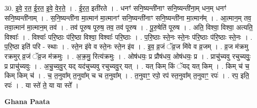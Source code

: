 \documentclass[17pt]{extarticle}
\begin{document}
30. इ॒वे॒ र॒त॒ ई॒र॒त॒ इ॒वे॒ वे॒र॒ते॒ । . ई॒र॒त॒ इती॑रते । . धनꣳ॑ सनि॒ष्यन्ती॑नाꣳ सनि॒ष्यन्ती॑ना॒म् धन॒म् धनꣳ॑ सनि॒ष्यन्ती॑नाम् । . स॒नि॒ष्यन्ती॑ना मा॒त्मान॑ मा॒त्मानꣳ॑ सनि॒ष्यन्ती॑नाꣳ सनि॒ष्यन्ती॑ना मा॒त्मान᳚म् । . आ॒त्मान॒म् तव॒ तवा॒त्मान॑ मा॒त्मान॒म् तव॑ । . तव॑ पूरुष पूरुष॒ तव॒ तव॑ पूरुष । . पू॒रु॒षेति॑ पूरुष । . अति॒ विश्वा॒ विश्वा॒ अत्यति॒ विश्वाः᳚ । . विश्वाः᳚ परि॒ष्ठाः प॑रि॒ष्ठा विश्वा॒ विश्वाः᳚ परि॒ष्ठाः । . प॒रि॒ष्ठाः स्ते॒नः स्ते॒नः प॑रि॒ष्ठाः प॑रि॒ष्ठाः स्ते॒नः । . प॒रि॒ष्ठा इति॑ परि - स्थाः । . स्ते॒न इ॑वे व स्ते॒नः स्ते॒न इ॑व । . इ॒व॒ व्र॒जं ॅव्र॒ज मि॑वे व व्र॒जम् । . व्र॒ज म॑क्रमु रक्रमुर् व्र॒जं ॅव्र॒ज म॑क्रमुः । . अ॒क्र॒मु॒ रित्य॑क्रमुः । . ओष॑धयः॒ प्र प्रौष॑धय॒ ओष॑धयः॒ प्र । . प्राचु॑च्यवु रचुच्यवुः॒ प्र प्राचु॑च्यवुः । . अ॒चु॒च्य॒वु॒र् यद् यद॑चुच्यवु रचुच्यवु॒र् यत् । . यत् किम् किं ॅयद् यत् किम् । . किम् च॑ च॒ किम् किम् च॑ । . च॒ त॒नुवा᳚म् त॒नुवा᳚म् च च त॒नुवा᳚म् । . त॒नुवाꣳ॒॒ रपो॒ रप॑ स्त॒नुवा᳚म् त॒नुवाꣳ॒॒ रपः॑ । . रप॒ इति॒ रपः॑ । . या स्ते॑ ते॒ या या स्ते᳚ । \newline

\textbf{Ghana Paata } \newline
\end{document}
